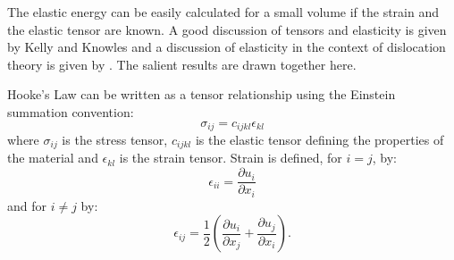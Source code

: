 The elastic energy can be easily calculated for a small volume if the strain and the elastic tensor are known. A good discussion of tensors and elasticity is given by Kelly and Knowles \cite{kelly_knowles2012chapter5_tensors,kelly_knowles2012chapter6_stress_strain} and a discussion of elasticity in the context of dislocation theory is given by \citet{hirth_lothe1982elasticity}. The salient results are drawn together here.

Hooke's Law can be written as a tensor relationship using the Einstein summation convention:
\begin{equation}
\sigma_{ij} = c_{ijkl} \epsilon_{kl}
\end{equation}
where $\sigma_{ij}$ is the stress tensor, $c_{ijkl}$ is the elastic tensor defining the properties of the material and $\epsilon_{kl}$ is the strain tensor. Strain is defined, for $i=j$, by:
\begin{equation}
\epsilon_{ii} = \frac{\partial u_i}{\partial x_i}
\end{equation}
and for $i\neq j$ by:
\begin{equation}
\epsilon_{ij} = \frac{1}{2} \left( \frac{\partial u_i}{\partial x_j} + \frac{\partial u_j}{\partial x_i} \right).
\end{equation}

